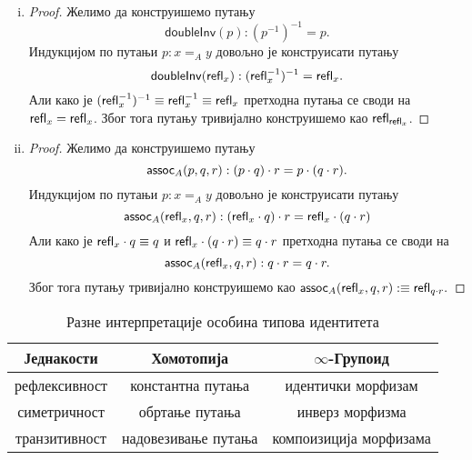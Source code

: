 \documentclass[12pt,oneside]{memoir}
\begin{document}
\begin{enumerate}[(i)]
\begin{proof}
        Али како је $\refl{x}^{-1} \equiv \refl{x}$ претходне путање се своде на оне као и у претходном доказу. Због тога обе путање тривијално конструишемо као $\refl{\refl{x}}$.
    \end{proof}
    \item
    \begin{proof}
        Желимо да конструишемо путању
        \[ \mathsf{doubleInv} (p) : (p^{-1})^{-1} = p. \]
        Индукцијом по путањи $p : x =_A y$ довољно је конструисати путању
        \[ \mathsf{doubleInv} (\mathsf{refl}_{x}) : (\mathsf{refl}_{x}^{-1})^{-1} = \mathsf{refl}_{x}. \]
        Али како је $(\mathsf{refl}_{x}^{-1})^{-1} \equiv \mathsf{refl}_{x}^{-1} \equiv \mathsf{refl}_{x}$ претходна путања се своди на $\mathsf{refl}_{x} = \mathsf{refl}_{x}$. Због тога путању тривијално конструишемо као $\refl{\refl{x}}$. 
    \end{proof} 
    \item
    \begin{proof}
        Желимо да конструишемо путању
        \[ \mathsf{assoc}_{A} (p, q, r) : (p \cdot q) \cdot r = p \cdot (q \cdot r). \]
        Индукцијом по путањи $p : x =_A y$ довољно је конструисати путању
        \[ \mathsf{assoc}_{A} (\mathsf{refl}_{x}, q, r) : (\mathsf{refl}_{x} \cdot q) \cdot r = \mathsf{refl}_{x} \cdot (q \cdot r) \]
        Али како је $\mathsf{refl}_{x} \cdot q \equiv q$ и $\mathsf{refl}_{x} \cdot (q \cdot r) \equiv q \cdot r$ претходна путања се своди на
        \[ \mathsf{assoc}_{A} (\mathsf{refl}_{x}, q, r) : q \cdot r = q \cdot r. \]
        Због тога путању тривијално конструишемо као $\mathsf{assoc}_{A} (\mathsf{refl}_{x}, q, r) :\equiv \mathsf{refl}_{q \cdot r}.$
    \end{proof}
\end{enumerate}

\begin{table}
    \begin{center}
        \begin{tabular}[c]{c c c}
            Једнакости & Хомотопија & $\infty$-Групоид \\
            \hline%
            рефлексивност & константна путања & идентички морфизам \\
            симетричност & обртање путања & инверз морфизма \\
            транзитивност & надовезивање путања & компоизиција морфизама\\
        \end{tabular}
    \end{center}
    \caption{Разне интерпретације особина типова идентитета}
    \label{table:inftygroupoid}
\end{table}
\end{document}
